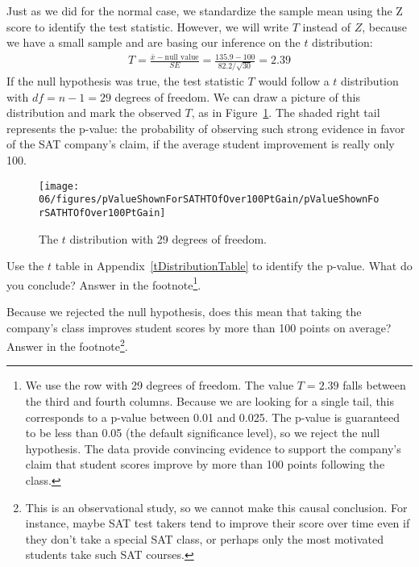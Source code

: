 Just as we did for the normal case, we standardize the sample mean using the Z score to identify the test statistic. However, we will write $T$ instead of $Z$, because we have a small sample and are basing our inference on the $t$ distribution:
\begin{eqnarray*}
T = \frac{\bar{x} - \text{null value}}{SE} = \frac{135.9 - 100}{82.2/\sqrt{30}} = 2.39
\end{eqnarray*}
If the null hypothesis was true, the test statistic $T$ would follow a $t$ distribution with $df = n-1 = 29$ degrees of freedom. We can draw a picture of this distribution and mark the observed $T$, as in Figure~\ref{pValueShownForSATHTOfOver100PtGain}. The shaded right tail represents the p-value: the probability of observing such strong evidence in favor of the SAT company's claim, if the average student improvement is really only 100.
\begin{figure}
\centering
\texttt{[image: 06/figures/pValueShownForSATHTOfOver100PtGain/pValueShownForSATHTOfOver100PtGain]}
\caption{The $t$ distribution with 29 degrees of freedom.}
\label{pValueShownForSATHTOfOver100PtGain}
\end{figure}

\begin{exercise}
Use the $t$ table in Appendix~\vref{tDistributionTable} to identify the p-value. What do you conclude? Answer in the footnote\footnote{We use the row with 29 degrees of freedom. The value $T=2.39$ falls between the third and fourth columns. Because we are looking for a single tail, this corresponds to a p-value between 0.01 and 0.025. The p-value is guaranteed to be less than 0.05 (the default significance level), so we reject the null hypothesis. The data provide convincing evidence to support the company's claim that student scores improve by more than 100 points following the class.}.
\end{exercise}

\begin{exercise}
Because we rejected the null hypothesis, does this mean that taking the company's class improves student scores by more than 100 points on average? Answer in the footnote\footnote{This is an observational study, so we cannot make this causal conclusion. For instance, maybe SAT test takers tend to improve their score over time even if they don't take a special SAT class, or perhaps only the most motivated students take such SAT courses.}.
\end{exercise}

